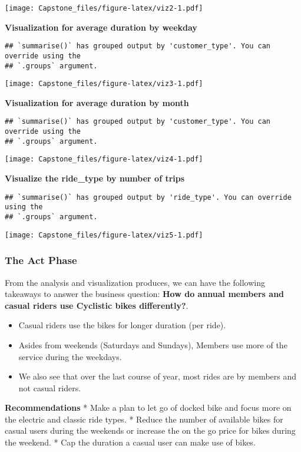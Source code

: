 \documentclass[
]{article}
\providecommand{\tightlist}{%
  \setlength{\itemsep}{0pt}\setlength{\parskip}{0pt}}
\begin{document}
\texttt{[image: Capstone\_files/figure-latex/viz2-1.pdf]}

\textbf{Visualization for average duration by weekday}

\begin{verbatim}
## `summarise()` has grouped output by 'customer_type'. You can override using the
## `.groups` argument.
\end{verbatim}

\texttt{[image: Capstone\_files/figure-latex/viz3-1.pdf]}

\textbf{Visualization for average duration by month}

\begin{verbatim}
## `summarise()` has grouped output by 'customer_type'. You can override using the
## `.groups` argument.
\end{verbatim}

\texttt{[image: Capstone\_files/figure-latex/viz4-1.pdf]}

\textbf{Visualize the ride\_type by number of trips}

\begin{verbatim}
## `summarise()` has grouped output by 'ride_type'. You can override using the
## `.groups` argument.
\end{verbatim}

\texttt{[image: Capstone\_files/figure-latex/viz5-1.pdf]}

\hypertarget{the-act-phase}{%
\subsubsection{The Act Phase}\label{the-act-phase}}

From the analysis and visualization produces, we can have the following
takeaways to answer the business question: \textbf{How do annual members
and casual riders use Cyclistic bikes differently?}.

\begin{itemize}
\tightlist
\item
  Casual riders use the bikes for longer duration (per ride).
\item
  Asides from weekends (Saturdays and Sundays), Members use more of the
  service during the weekdays.
\item
  We also see that over the last course of year, most rides are by
  members and not casual riders.
\end{itemize}

\textbf{Recommendations} * Make a plan to let go of docked bike and
focus more on the electric and classic ride types. * Reduce the number
of available bikes for casual users during the weekends or increase the
on the go price for bikes during the weekend. * Cap the duration a
casual user can make use of bikes.
\end{document}
